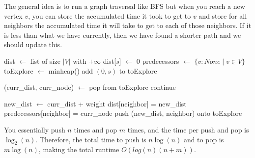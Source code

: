 \documentclass{article}
\begin{document}
    \begin{algo}
      The general idea is to run a graph traversal like BFS but when you reach a new vertex $v$, you can store the accumulated time it took to get to $v$ and store for all neighbors the accumulated time it will take to get to each of those neighbors. If it is less than what we have currently, then we have found a shorter path and we should update this. 
      \begin{algorithm}[H]
        \label{alg:dijkstra}
        \begin{algorithmic}[1]
            \State dist $\gets$ list of size $|V|$ with $+\infty$ 
            \State dist[$s$] $\gets$ 0 
            \State predecessors $\gets$ $\{v : None \mid v \in V \}$ 
            \State toExplore $\gets$ minheap() 
            \State add $(0, s)$ to toExplore 

            \State (curr\_dist, curr\_node) $\gets$ pop from toExplore  
                
                \State continue 
              \EndIf 

               
                \State new\_dist $\gets$ curr\_dist + weight 
                 
                  \State dist[neighbor] = new\_dist 
                  \State predecessors[neighbor] = curr\_node 
                  \State push (new\_dist, neighbor) onto toExplore 
                \EndIf
              \EndFor
            \EndWhile
            \State {}
          \EndFunction
        \end{algorithmic}
      \end{algorithm}

      You essentially push $n$ times and pop $m$ times, and the time per push and pop is $\log_2 (n)$. Therefore, the total time to push is $n \log(n)$ and to pop is $m \log (n)$, making the total runtime $O(log(n) (n+m))$. 
    \end{algo}
\end{document}
